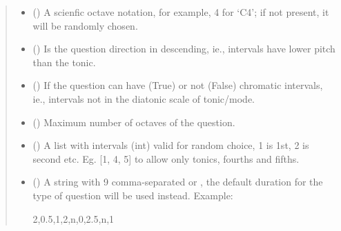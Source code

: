 \documentclass[letterpaper,10pt,english]{sphinxmanual}
\begin{document}
\begin{fulllineitems}
\begin{fulllineitems}
\begin{quote}
\begin{description}
\begin{itemize}
\item {} 
 () \textendash{} A scienfic octave notation, for example, 4 for ‘C4’;
if not present, it will be randomly chosen.

\item {} 
 () \textendash{} Is the question direction in descending, ie.,
intervals have lower pitch than the tonic.

\item {} 
 () \textendash{} If the question can have (True) or not (False)
chromatic intervals, ie., intervals not in the diatonic scale
of tonic/mode.

\item {} 
 () \textendash{} Maximum number of octaves of the question.

\item {} 
 () \textendash{} A list with intervals (int) valid for
random choice, 1 is 1st, 2 is second etc. Eg. {[}1, 4, 5{]} to
allow only tonics, fourths and fifths.

\item {} 
 () \textendash{} 
A string with 9 comma-separated  or
, the
default duration for the type of question will be used instead.
Example:

\begin{sphinxVerbatim}[commandchars=\\\{\}]
\PYGZdq{}2,0.5,1,2,n,0,2.5,n,1\PYGZdq{}
\end{sphinxVerbatim}



\end{itemize}
\end{description}
\end{quote}
\end{fulllineitems}
\end{fulllineitems}
\end{document}
